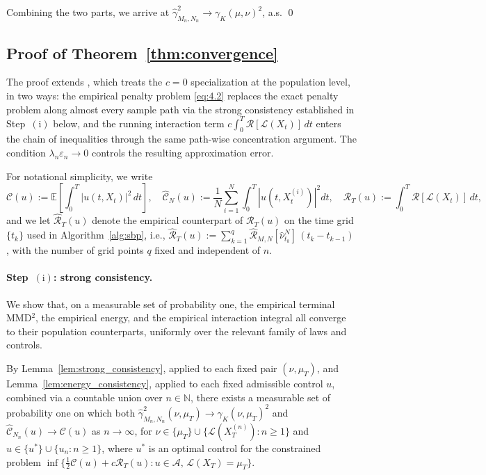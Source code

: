 \documentclass[11pt,leqno]{article}
\theoremstyle{plain}
\theoremstyle{remark}
\theoremstyle{definition}
\numberwithin{equation}{section}
\numberwithin{figure}{section}
\numberwithin{table}{section}
\numberwithin{algorithm}{section}
\newcommand{\EE}{\mathbb{E}}
\begin{document}
Combining the two parts, we arrive at $\hat{\gamma}_{M_n,N_n}^2\to \gamma_K(\mu,\nu)^2$, a.s.
\qed


\subsection{Proof of Theorem~\ref{thm:convergence}}\label{sec:6.2}

The proof extends \cite[Theorem~3.1]{nak:2024sb}, which treats the $c=0$ specialization at the population level,
in two ways: the empirical penalty problem \eqref{eq:4.2} replaces the exact penalty problem along almost every sample path
via the strong consistency established in Step~$(\mathrm{i})$ below, and the running interaction term
$c\int_0^T\mathcal{R}[\mathcal{L}(X_t)]\,dt$ enters the chain of inequalities through the same path-wise concentration argument.
The condition $\lambda_n\varepsilon_n\to 0$ controls the resulting approximation error.

For notational simplicity, we write
\[
 \mathcal{C}(u) := \EE\!\left[\int_0^T|u(t,X_t)|^2\,dt\right],\quad
 \hat{\mathcal{C}}_N(u) := \frac{1}{N}\sum_{i=1}^N\int_0^T |u(t,X_t^{(i)})|^2 dt,\quad
 \mathcal{R}_T(u) := \int_0^T\mathcal{R}[\mathcal{L}(X_t)]\,dt,
\]
and we let $\hat{\mathcal{R}}_T(u)$ denote the empirical counterpart of $\mathcal{R}_T(u)$
on the time grid $\{t_k\}$ used in Algorithm~\ref{alg:sbp},
i.e., $\hat{\mathcal{R}}_T(u):=\sum_{k=1}^{q}\hat{\mathcal{R}}_{M,N}[\hat\nu^N_{t_k}]\,(t_k-t_{k-1})$,
with the number of grid points $q$ fixed and independent of $n$.

\paragraph{Step~$(\mathrm{i})$: strong consistency.}
We show that, on a measurable set of probability one,
the empirical terminal MMD${}^2$, the empirical energy, and the empirical interaction integral
all converge to their population counterparts, uniformly over the relevant family of laws and controls.

By Lemma~\ref{lem:strong_consistency}, applied to each fixed pair $(\nu,\mu_T)$,
and Lemma~\ref{lem:energy_consistency}, applied to each fixed admissible control $u$,
combined via a countable union over $n\in\mathbb{N}$,
there exists a measurable set of probability one on which both
$\hat{\gamma}_{M_n,N_n}^2(\nu,\mu_T)\to\gamma_K(\nu,\mu_T)^2$ and
$\hat{\mathcal{C}}_{N_n}(u)\to\mathcal{C}(u)$ as $n\to\infty$,
for $\nu\in\{\mu_T\}\cup\{\mathcal{L}(X_T^{(n)}):n\ge 1\}$
and $u\in\{u^*\}\cup\{u_n:n\ge 1\}$,
where $u^*$ is an optimal control for the constrained problem
$\inf\{\frac{1}{2}\mathcal{C}(u)+c\mathcal{R}_T(u):u\in\mathcal{A},\,\mathcal{L}(X_T)=\mu_T\}$.
\end{document}
